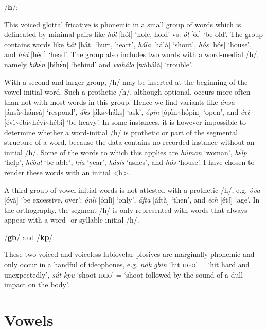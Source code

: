 /\textbf{h}/:

This voiced glottal fricative is phonemic in a small group of words which is delineated by minimal pairs like \textit{hól} [hól] ‘hole, hold’ vs. \textit{ól} [ól] ‘be old’. The group contains words like \textit{hát} [hát] ‘hurt, heart’, \textit{hála} [hálà] ‘shout’, \textit{hós} [hós] ‘house’, and \textit{héd} [héd] ‘head’. The group also includes two words with a word-medial /h/, namely \textit{bihɛ́n} [bìhɛ́n] ‘behind’ and \textit{wahála} [wàhálà] ‘trouble’. 


With a second and larger group, /h/ may be inserted at the beginning of the vowel-initial word. Such a prothetic /h/, although optional, occurs more often than not with most words in this group. Hence we find variants like \textit{ánsa} [ánsà\textasciitilde hánsà] ‘respond’, \textit{áks} [áks\textasciitilde háks] ‘ask’, \textit{ópin} [ópìn\textasciitilde hópìn] ‘open’, and \textit{évi} [évì\textasciitilde ébì\textasciitilde hévì\textasciitilde hébì] ‘be heavy’. In some instances, it is however impossible to determine whether a word-initial /h/ is prothetic or part of the segmental structure of a word, because the data contains no recorded instance without an initial /h/. Some of the words to which this applies are \textit{húman} ‘woman’, \textit{hɛ́lp} ‘help’, \textit{hébul} ‘be able’, \textit{hía} ‘year’, \textit{hásis} ‘ashes’, and \textit{hós} ‘house’. I have chosen to render these words with an initial <h>.{\fff}



A third group of vowel-initial words is not attested with a prothetic /h/, e.g. \textit{óva} [óvà] ‘be excessive, over’; \textit{ónli} [ónlì] ‘only’, \textit{áfta} [áftà] ‘then’, and \textit{éch} [étʃ] ‘age’. In the orthography, the segment /h/ is only represented with words that always appear with a word- or syllable-initial /h/. 


/\textbf{gb}/ and /\textbf{kp}/:

These two voiced and voiceless labiovelar plosives are marginally phonemic and only occur in a handful of ideophones, e.g.\textit{ nák gbin} ‘hit \textsc{ideo}’ = ‘hit hard and unexpectedly’, \textit{sút kpu} ‘shoot \textsc{ideo}’ = ‘shoot followed by the sound of a dull impact on the body’.

\section{Vowels}\label{sec:2.3}

